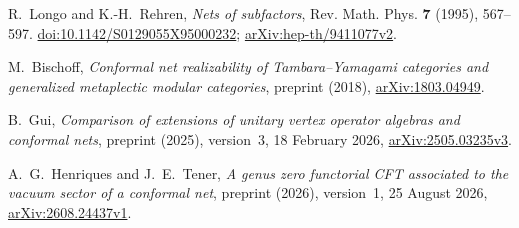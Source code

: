 R.~Longo and K.-H.~Rehren,
\emph{Nets of subfactors},
Rev. Math. Phys. \textbf{7} (1995), 567--597.
\href{https://doi.org/10.1142/S0129055X95000232}{doi:10.1142/S0129055X95000232};
\href{https://arxiv.org/abs/hep-th/9411077v2}{arXiv:hep-th/9411077v2}.

M.~Bischoff,
\emph{Conformal net realizability of Tambara--Yamagami categories
and generalized metaplectic modular categories},
preprint (2018),
\href{https://arxiv.org/abs/1803.04949}{arXiv:1803.04949}.

B.~Gui,
\emph{Comparison of extensions of unitary vertex operator algebras
and conformal nets},
preprint (2025), version~3, 18 February 2026,
\href{https://arxiv.org/abs/2505.03235v3}{arXiv:2505.03235v3}.

A.~G.~Henriques and J.~E.~Tener,
\emph{A genus zero functorial CFT associated to the vacuum sector
of a conformal net},
preprint (2026), version~1, 25 August 2026,
\href{https://arxiv.org/abs/2608.24437v1}{arXiv:2608.24437v1}.
